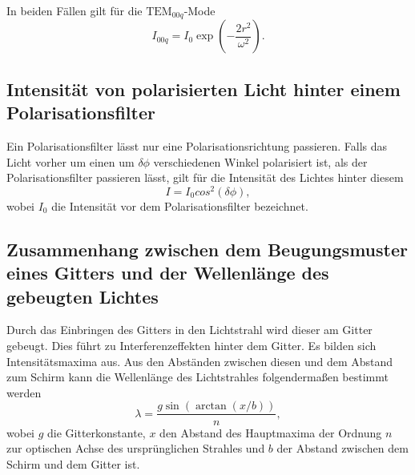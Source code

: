 In beiden Fällen gilt für die $\text{TEM}_{00q}$-Mode
\begin{equation}
I_{00q} = I_0 \exp\left(-\frac{2 r^2}{\omega ^2}\right). \label{eq:gaus}
\end{equation}

\subsection{Intensität von polarisierten Licht hinter einem Polarisationsfilter}
Ein Polarisationsfilter lässt nur eine Polarisationsrichtung passieren. Falls das Licht vorher um einen um $\delta\phi$ verschiedenen Winkel polarisiert ist, als der Polarisationsfilter passieren lässt, gilt für die Intensität des Lichtes hinter diesem
\begin{equation}
	I=I_0 cos^2(\delta\phi), \label{eq:polar}
\end{equation}
wobei $I_0$ die Intensität vor dem Polarisationsfilter bezeichnet.

\subsection{Zusammenhang zwischen dem Beugungsmuster eines Gitters und der Wellenlänge des gebeugten Lichtes}
Durch das Einbringen des Gitters in den Lichtstrahl wird dieser am Gitter gebeugt. Dies führt zu Interferenzeffekten hinter dem Gitter. Es bilden sich Intensitätsmaxima aus. Aus den Abständen zwischen diesen und dem Abstand zum Schirm kann die Wellenlänge des Lichtstrahles folgendermaßen bestimmt werden
\begin{equation}
	\lambda = \frac{g \sin(\arctan(x/b))}{n}, \label{eq:lambda}
\end{equation}
wobei $g$ die Gitterkonstante, $x$ den Abstand des Hauptmaxima der Ordnung $n$ zur optischen Achse des ursprünglichen Strahles und $b$ der Abstand zwischen dem Schirm und dem Gitter ist.



